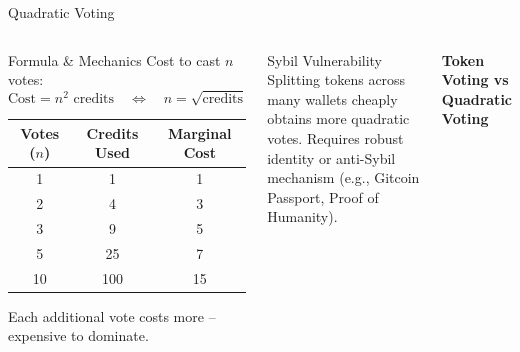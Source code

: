 \documentclass[8pt,aspectratio=169]{beamer}
\begin{document}
\begin{frame}{Quadratic Voting}
\begin{columns}[T]
\begin{block}{Formula \& Mechanics}
\footnotesize
Cost to cast $n$ votes:\vspace{1mm}
\[
\text{Cost} = n^2 \text{ credits} \quad\Longleftrightarrow\quad n = \sqrt{\text{credits}}
\]
\vspace{1mm}
\begin{center}
\footnotesize
\begin{tabular}{ccc}
\toprule
Votes ($n$) & Credits Used & Marginal Cost \\
\midrule
1 & 1 & 1 \\
2 & 4 & 3 \\
3 & 9 & 5 \\
5 & 25 & 7 \\
10 & 100 & 15 \\
\bottomrule
\end{tabular}
\end{center}
\vspace{1mm}
Each additional vote costs more -- expensive to dominate.
\end{block}
\vspace{2mm}
\begin{alertblock}{Sybil Vulnerability}
\footnotesize
Splitting tokens across many wallets cheaply obtains more quadratic votes. Requires robust identity or anti-Sybil mechanism (e.g., Gitcoin Passport, Proof of Humanity).
\end{alertblock}

\vspace{2mm}
\begin{center}
\textbf{\small Token Voting vs Quadratic Voting}
\end{center}
\end{columns}
\end{frame}
\end{document}
